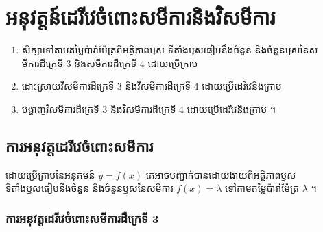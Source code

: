 \chapter{អនុវត្តន៍ដេរីវេចំពោះសមីការនិងវិសមីការ}

\begin{objBox}[វត្ថុបំណង]
\begin{enumerate}[1]
  \item សិក្សាទៅតាមតម្លៃប៉ារ៉ាម៉ែត្រពីអត្ថិភាពឫស ទីតាំងឫសធៀបនឹងចំនួន និងចំនួនឫសនៃសមីការដឺក្រេទី $3$ និងសមីការដឺក្រេទី $4$ ដោយប្រើក្រាប
  \item ដោះស្រាយវិសមីការដឺក្រេទី $3$ និងវិសមីការដឺក្រេទី $4$ ដោយប្រើដេរីវេនិងក្រាប
  \item បង្ហាញវិសមីការដឺក្រេទី $3$ និងវិសមីការដឺក្រេទី $4$ ដោយប្រើដេរីវេនិងក្រាប ។
\end{enumerate}
\end{objBox}

\section{ការអនុវត្តដេរីវេចំពោះសមីការ}

ដោយប្រើក្រាបនៃអនុគមន៍ $y = f(x)$ គេអាចបញ្ជាក់បានដោយងាយពីអត្ថិភាពឫស ទីតាំងឫសធៀបនឹងចំនួន និងចំនួនឫសនៃសមីការ $f(x) = \lambda$ ទៅតាមតម្លៃប៉ារ៉ាម៉ែត្រ $\lambda$ ។

\subsection{ការអនុវត្តដេរីវេចំពោះសមីការដឺក្រេទី 3}


